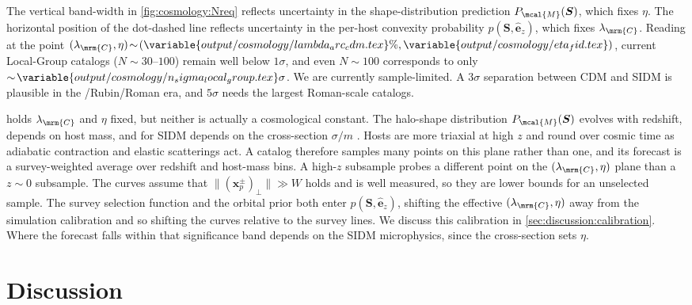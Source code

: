 \documentclass[linenumbers,twocolumn]{aastex701}
\renewcommand{\mbf}[1]{\boldsymbol{#1}}
\newcommand{\zhat}{\hat{\mbf{e}}_z} %
\newcommand{\xvec}{\mbf{x}}  %
\newcommand{\proj}[1]{{#1}_{p}}  %
\newcommand{\xsky}{\proj{\xvec}}  %
\newcommand{\lamC}{\ensuremath{\lambda_{\mrm{C}}}}    %
\newcommand{\lamCval}{\variable{output/cosmology/lambda_arc_cdm.tex}\%}
\begin{document}
        The vertical band-width in \cref{fig:cosmology:Nreq} reflects uncertainty in the shape-distribution prediction $P_{\mcal{M}}(\mbf{S})$, which fixes $\eta$. %
        The horizontal position of the dot-dashed line reflects uncertainty in the per-host convexity probability $p(\mbf{S},\zhat)$, which fixes $\lamC$. %
        Reading at the point $(\lamC,\eta)\!\sim\!(\lamCval,\variable{output/cosmology/eta_fid.tex})$, current Local-Group catalogs ($N\!\sim\!\numrange{30}{100}$) remain well below $1\sigma$, and even $N\!\sim\!100$ corresponds to only $\sim\!\variable{output/cosmology/n_sigma_local_group.tex}\sigma$. %
        We are currently sample-limited. %
        A $3\sigma$ separation between \gls{CDM} and \gls{SIDM} is plausible in the \euclid{}/\gls{Rubin}/\gls{Roman} era, and $5\sigma$ needs the largest \gls{Roman}-scale catalogs. %

         holds $\lamC$ and $\eta$ fixed, but neither is actually a cosmological constant. %
        The halo-shape distribution $P_{\mcal{M}}(\mbf{S})$ evolves with redshift, depends on host mass, and for \gls{SIDM} depends on the cross-section $\sigma/m$ \citep{Vera-Ciro+:2011:ShapeDarkMatter,Vargya+:2022:ShapesMilkyWayMassGalaxies,Bautista+:2025:JeansModelShapes}. %
        Hosts are more triaxial at high $z$ and round over cosmic time as adiabatic contraction and elastic scatterings act. %
        A catalog therefore samples many points on this plane rather than one, and its forecast is a survey-weighted average over redshift and host-mass bins. %
        A high-$z$ subsample probes a different point on the $(\lamC,\eta)$ plane than a $z\!\sim\!0$ subsample. %
        The curves assume that $\|(\xsky^{\pm})_{\perp}\|\gg W$ holds and is well measured, so they are lower bounds for an unselected sample. %
        The survey selection function and the orbital prior both enter $p(\mbf{S},\zhat)$, shifting the effective $(\lamC,\eta)$ away from the simulation calibration and so shifting the curves relative to the survey lines. %
        We discuss this calibration in \autoref{sec:discussion:calibration}. %
        Where the forecast falls within that significance band depends on the \gls{SIDM} microphysics, since the cross-section sets $\eta$. %



\section{Discussion}\label{sec:discussion}
\end{document}
